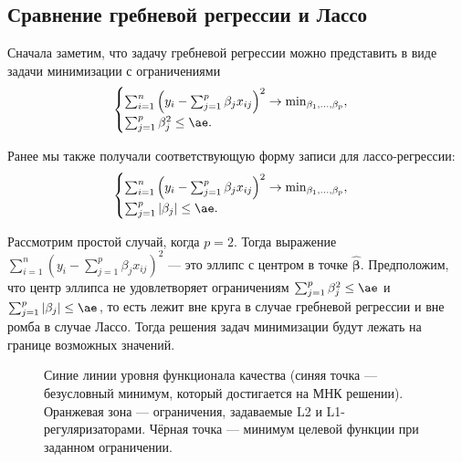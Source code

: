 \documentclass[12pt,a4paper,final]{article}
\newcommand{\1}{\mathds{1}}
\begin{document}
\subsection{Сравнение гребневой регрессии и Лассо}

Сначала заметим, что задачу гребневой регрессии можно  представить в виде задачи минимизации с ограничениями
\begin{equation*}
	\begin{cases}
		\sum_{i=1}^{n}
		\left(
		y_{i}
		-
		\sum_{j=1}^{p}\beta_{j}x_{ij}
		\right)^{2}
		\to
		\min_{\beta_{1},\ldots,\beta_{p}},\\
		\sum_{j=1}^{p}\beta_{j}^{2}\leq\ae.
	\end{cases}
\end{equation*}


Ранее мы также получали соответствующую форму записи для лассо-регрессии:
\begin{equation*}
	\begin{cases}
		\sum_{i=1}^{n}
		\left(
		y_{i}
		-
		\sum_{j=1}^{p}\beta_{j}x_{ij}
		\right)^{2}
		\to
		\min_{\beta_{1},\ldots,\beta_{p}},\\
		\sum_{j=1}^{p}|\beta_{j}|\leq\ae.
	\end{cases}
\end{equation*}

Рассмотрим простой случай, когда $p = 2$. Тогда выражение $\sum_{i=1}^n(y_i - \sum_{j=1}^p \beta_j x_{ij})^2$ --- это эллипс с центром в точке $\hat{\bm\beta}$. Предположим, что центр эллипса не удовлетворяет ограничениям $\sum_{j = 1}^p \beta_j^2 \leq\ae$ и $\sum_{j = 1}^p |\beta_j| \leq \ae$, то есть лежит вне круга в случае гребневой регрессии и вне ромба в случае Лассо. Тогда решения задач минимизации будут лежать на границе возможных значений. 
\begin{figure}[h]
	\caption{Синие линии уровня функционала качества (синяя точка --- безусловный минимум, который достигается на МНК решении). Оранжевая зона --- ограничения, задаваемые L2 и L1-регуляризаторами. Чёрная точка --- минимум целевой функции при заданном ограничении.}
\end{figure}
\end{document}
